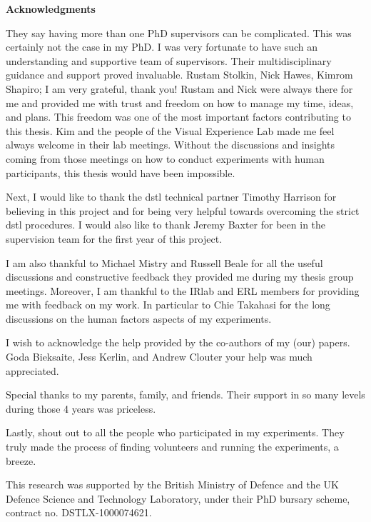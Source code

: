 \ifdefined\build\else\fi 

\begin{center}
\textbf{Acknowledgments}
\end{center}

They say having more than one PhD supervisors can be complicated. This was certainly not the case in my PhD. I was very fortunate to have such an understanding and supportive team of supervisors. Their multidisciplinary guidance and support proved invaluable. Rustam Stolkin, Nick Hawes, Kimrom Shapiro; I am very grateful, thank you! Rustam and Nick were always there for me and provided me with trust and freedom on how to manage my time, ideas, and plans. This freedom was one of the most important factors contributing to this thesis. Kim and the people of the Visual Experience Lab made me feel always welcome in their lab meetings. Without the discussions and insights coming from those meetings on how to conduct experiments with human participants, this thesis would have been impossible. 

Next, I would like to thank the dstl technical partner Timothy Harrison for believing in this project and for being very helpful towards overcoming the strict dstl procedures. I would also like to thank Jeremy Baxter for been in the supervision team for the first year of this project.

I am also thankful to Michael Mistry and Russell Beale for all the useful discussions and constructive feedback they provided me during my thesis group meetings. Moreover, I am thankful to the IRlab and ERL members for providing me with feedback on my work. In particular to Chie Takahasi for the long discussions on the human factors aspects of my experiments.

I wish to acknowledge the help provided by the co-authors of my (our) papers. Goda Bieksaite, Jess Kerlin, and Andrew Clouter your help was much appreciated.

Special thanks to my parents, family, and friends. Their support in so many levels during those 4 years was priceless.

Lastly, shout out to all the people who participated in my experiments. They truly made the process of finding volunteers and running the experiments, a breeze. 

This research was supported by the British Ministry of Defence and the UK Defence Science and Technology Laboratory, under their PhD bursary scheme, contract no. DSTLX-1000074621.

\ifdefined\build\else\fi
